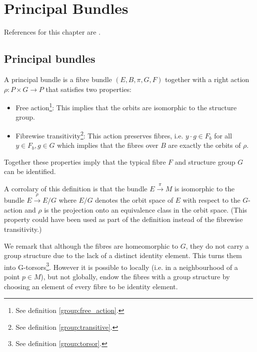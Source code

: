 



\chapter{Principal Bundles}\label{manifolds:section:principal_bundles}

References for this chapter are \cite{principal_bundles}.

\section{Principal bundles}

	\begin{definition}
		A principal bundle is a fibre bundle $(E, B, \pi, G, F)$ together with a right action $\rho:P\times G\rightarrow P$ that satisfies two properties:
		\begin{itemize}
			\item Free action\footnote{See definition \ref{group:free_action}.}: This implies that the orbits are isomorphic to the structure group.
			\item Fibrewise transitivity\footnote{See definition \ref{group:transitive}.}: This action preserves fibres, i.e. $y\cdot g\in F_b$ for all $y\in F_b, g\in G$ which implies that the fibres over $B$ are exactly the orbits of $\rho$.
		\end{itemize}
		Together these properties imply that the typical fibre $F$ and structure group $G$ can be identified.
	\end{definition}
	\begin{property}
		A corrolary of this definition is that the bundle $E\xrightarrow{\pi}M$ is isomorphic to the bundle $E\xrightarrow{\rho}E/G$ where $E/G$ denotes the orbit space of $E$ with respect to the $G$-action and $\rho$ is the projection onto an equivalence class in the orbit space. (This property could have been used as part of the definition instead of the fibrewise transitivity.)
	\end{property}
	\begin{remark}
		We remark that although the fibres are homeomorphic to $G$, they do not carry a group structure due to the lack of a distinct identity element. This turns them into G-torsors\footnote{See definition \ref{group:torsor}.}. However it is possible to locally (i.e. in a neighbourhood of a point $p\in M$), but not globally, endow the fibres with a group structure by choosing an element of every fibre to be identity element.
	\end{remark}
	
